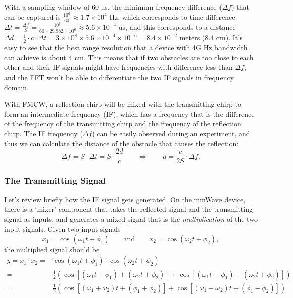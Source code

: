\documentclass[11pt, oneside]{article}   	%
\begin{document}
With a sampling window of 60 us, the minimum frequency difference ($\Delta f$) that can be captured is $\frac{10^6}{60} \approx 1.7\times 10^4$ Hz, which corresponds to time difference $\Delta t = \frac{\Delta f}{S} = \frac{10^6}{60\times 29.982 \times 10^6} \approx 5.6\times 10^{-4}$ us, and this corresponds to a distance $\Delta d = \frac{1}{2}\cdot c\cdot \Delta t = 3\times 10^8 \times 5.6\times 10^{-4}\times 10^{-6} = 8.4\times 10^{-2}$ meters (8.4 cm). It's easy to see that the best range resolution that a device with 4G Hz bandwidth can achieve is about 4 cm. This means that if two obstacles are too close to each other and their IF signals might have frequencies with difference less than $\Delta f$, and the FFT won't be able to differentiate the two IF signals in frequency domain.

With FMCW, a reflection chirp will be mixed with the transmitting chirp to form an intermediate frequency (IF), which has a frequency that is the difference of the frequency of the transmitting chirp and the frequency of the reflection chirp. The IF frequency ($\Delta f$) can be easily observed during an experiment, and thus we can calculate the distance of the obstacle that causes the reflection: 
$$\Delta f = S\cdot \Delta t = S\cdot \frac{2d}{c} \qquad \Rightarrow \qquad d = \frac{c}{2S}\cdot \Delta f.$$

\subsubsection{The Transmitting Signal}
Let's review briefly how the IF signal gets generated. On the mmWave device, there is a `mixer'  component that takes the reflected signal and the transmitting signal as inputs, and generates a mixed signal that is the \emph{multiplication} of the two input signals. Given two input signals 
$$x_1 = \cos(\omega_1 t + \phi_1) \qquad \text{and}\qquad x_2 = \cos(\omega_2 t + \phi_2),$$
the multiplied signal should be 
\begin{align*}
y = x_1 \cdot x_2  = & \cos(\omega_1 t + \phi_1) \cdot \cos(\omega_2 t + \phi_2) \\
= & \frac{1}{2}\left(\cos\left[(\omega_1 t +\phi_1)+ (\omega_2 t +\phi_2)\right]+ \cos\left[(\omega_1 t +\phi_1)- (\omega_2 t +\phi_2)\right]\right)\\
= & \frac{1}{2}\left(\cos\left[(\omega_1 +\omega_2) t + (\phi_1 +\phi_2)\right]+ \cos\left[(\omega_1 - \omega_2) t + (\phi_1 - \phi_2)\right]\right)
\end{align*}
\end{document}
